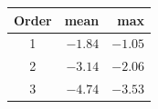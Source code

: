 \begin{tabular}{crr}
\toprule
Order & mean & max \\
\midrule
1 & $-1.84$ & $-1.05$ \\
2 & $-3.14$ & $-2.06$ \\
3 & $-4.74$ & $-3.53$ \\
\bottomrule
\end{tabular}

